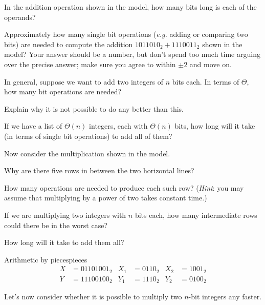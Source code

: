 \documentclass{tufte-handout}
\begin{document}
\begin{questions}
\item In the addition operation shown in the model, how many bits long
  is each of the operands?
\item Approximately how many single bit operations (\emph{e.g.} adding
  or comparing two bits) are needed to compute the addition
  $1011010_2 + 1110011_2$ shown in the model?  Your answer should be a
  number, but don't spend too much time arguing over the precise
  answer; make sure you agree to within $\pm 2$ and move on.
\item In general, suppose we want to add two integers of $n$ bits
  each.  In terms of $\Theta$, how many bit operations are needed?
\item Explain why it is not possible to do any better than this.
\item If we have a list of $\Theta(n)$ integers, each with
  $\Theta(n)$ bits, how long will it take (in terms of single bit
  operations) to add all of them?
\end{questions}

Now consider the multiplication shown in the model.

\begin{questions}
\item Why are there five rows in between the two horizontal lines?
\item How many operations are needed to produce each such row?
  (\emph{Hint}: you may assume that multiplying by a power of two
  takes constant time.)
\item If we are multiplying two integers with $n$ bits each, how many
  intermediate rows could there be in the worst case?
\item How long will it take to add them all?
\end{questions}

\pause

\begin{model*}{Arithmetic by pieces}{pieces}
  \begin{align*}
    X &= 01101001_2 & X_1 &= 0110_2 & X_2 &= 1001_2 \\
    Y &= 11100100_2 & Y_1 &= 1110_2 & Y_2 &= 0100_2
  \end{align*}
\end{model*}

Let's now consider whether it is possible to multiply two $n$-bit
integers any faster.
\end{document}
